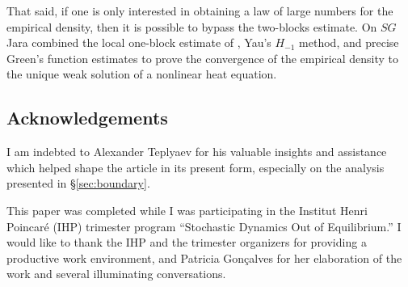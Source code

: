 \documentclass[11pt]{amsart}
\theoremstyle{plain}
\theoremstyle{definition}
\theoremstyle{remark}
\begin{document}
That said, if one is only interested in obtaining a law of large numbers for the empirical density, then it is possible to bypass the two-blocks estimate. On $SG$ Jara \cite{Jara} combined the local one-block estimate of \cite{JLSLocal}, Yau's $H_{-1}$ method, and precise Green's function estimates to prove the convergence of the empirical density to the unique weak solution of a nonlinear heat equation.

\subsection*{Acknowledgements}

I am indebted to Alexander Teplyaev for his valuable insights and assistance which helped shape the article in its present form, especially on the analysis presented in \S\ref{sec:boundary}.

This paper was completed while I was participating in the Institut Henri Poincar\'e (IHP) trimester program ``Stochastic Dynamics Out of Equilibrium.'' I would like to thank the IHP and the trimester organizers for providing a productive work environment, and Patricia Gon\c calves for her elaboration of the work \cite{BMNS} and several illuminating conversations.
\end{document}
